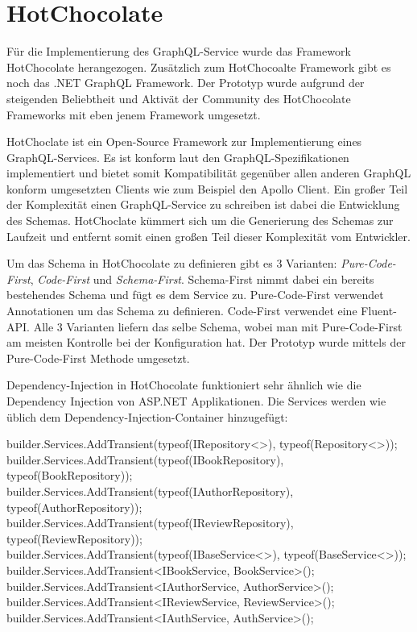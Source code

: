 \section{HotChocolate}
Für die Implementierung des GraphQL-Service wurde das Framework HotChocolate herangezogen.
Zusätzlich zum HotChocoalte Framework gibt es noch das .NET GraphQL Framework.
Der Prototyp wurde aufgrund der steigenden Beliebtheit und Aktivät der Community des HotChocolate Frameworks mit eben jenem Framework umgesetzt.

HotChoclate ist ein Open-Source Framework zur Implementierung eines GraphQL-Services.
Es ist konform laut den GraphQL-Spezifikationen implementiert und bietet somit Kompatibilität gegenüber allen anderen GraphQL konform umgesetzten Clients wie zum Beispiel den Apollo Client.
Ein großer Teil der Komplexität einen GraphQL-Service zu schreiben ist dabei die Entwicklung des Schemas.
HotChoclate kümmert sich um die Generierung des Schemas zur Laufzeit und entfernt somit einen großen Teil dieser Komplexität vom Entwickler.

Um das Schema in HotChocolate zu definieren gibt es 3 Varianten: \textit{Pure-Code-First}, \textit{Code-First} und \textit{Schema-First}.
Schema-First nimmt dabei ein bereits bestehendes Schema und fügt es dem Service zu.
Pure-Code-First verwendet Annotationen um das Schema zu definieren.
Code-First verwendet eine Fluent-API.
Alle 3 Varianten liefern das selbe Schema, wobei man mit Pure-Code-First am meisten Kontrolle bei der Konfiguration hat.
Der Prototyp wurde mittels der Pure-Code-First Methode umgesetzt.

Dependency-Injection in HotChocolate funktioniert sehr ähnlich wie die Dependency Injection von ASP.NET Applikationen.
Die Services werden wie üblich dem Dependency-Injection-Container hinzugefügt:

\begin{JsCode}
builder.Services.AddTransient(typeof(IRepository<>), typeof(Repository<>));
builder.Services.AddTransient(typeof(IBookRepository), typeof(BookRepository));
builder.Services.AddTransient(typeof(IAuthorRepository), typeof(AuthorRepository));
builder.Services.AddTransient(typeof(IReviewRepository), typeof(ReviewRepository));
builder.Services.AddTransient(typeof(IBaseService<>), typeof(BaseService<>));
builder.Services.AddTransient<IBookService, BookService>();
builder.Services.AddTransient<IAuthorService, AuthorService>();
builder.Services.AddTransient<IReviewService, ReviewService>();
builder.Services.AddTransient<IAuthService, AuthService>();
\end{JsCode}

